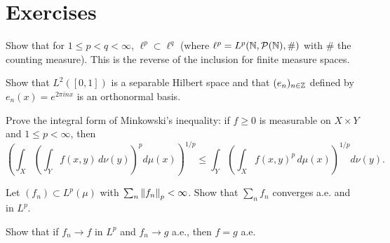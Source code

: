 \section{Exercises}

\begin{exercise}
Show that for $1 \leq p < q < \infty$, $\ell^p \subset \ell^q$ (where
$\ell^p = L^p(\mathbb{N}, \mathcal{P}(\mathbb{N}), \#)$ with $\#$ the counting measure). This is
the reverse of the inclusion for finite measure spaces.
\end{exercise}

\begin{exercise}
Show that $L^2([0,1])$ is a separable Hilbert space and that
$(e_n)_{n \in \mathbb{Z}}$ defined by $e_n(x) = e^{2\pi inx}$ is an orthonormal basis.
\end{exercise}

\begin{exercise}
Prove the integral form of Minkowski's inequality: if $f \geq 0$ is measurable on
$X \times Y$ and $1 \leq p < \infty$, then
\[
\left(\int_X \left(\int_Y f(x,y)\, d\nu(y)\right)^p d\mu(x)\right)^{1/p}
\leq \int_Y \left(\int_X f(x,y)^p\, d\mu(x)\right)^{1/p} d\nu(y).
\]
\end{exercise}

\begin{exercise}
Let $(f_n) \subset L^p(\mu)$ with $\sum_n \left\| f_n \right\|_p < \infty$. Show that
$\sum_n f_n$ converges a.e. and in $L^p$.
\end{exercise}

\begin{exercise}
Show that if $f_n \to f$ in $L^p$ and $f_n \to g$ a.e., then $f = g$ a.e.
\end{exercise}
